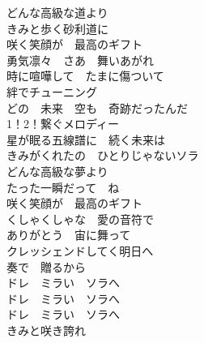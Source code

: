 {どんな高級な道より\\
きみと歩く砂利道に\\
咲く笑顔が　最高のギフト\\
勇気凛々　さあ　舞いあがれ\\[1em]

時に喧嘩して　たまに傷ついて\\
絆でチューニング\\
どの　未来　空も　奇跡だったんだ\\[1em]

1！2！繋ぐメロディー\\
星が眠る五線譜に　続く未来は\\
きみがくれたの　ひとりじゃないソラ\\

どんな高級な夢より\\
たった一瞬だって　ね\\
咲く笑顔が　最高のギフト\\

くしゃくしゃな　愛の音符で\\
ありがとう　宙に舞って\\
クレッシェンドしてく明日へ\\
奏で　贈るから\\
ドレ　ミラい　ソラへ\\
ドレ　ミラい　ソラへ\\
ドレ　ミラい　ソラへ\\

きみと咲き誇れ
}

